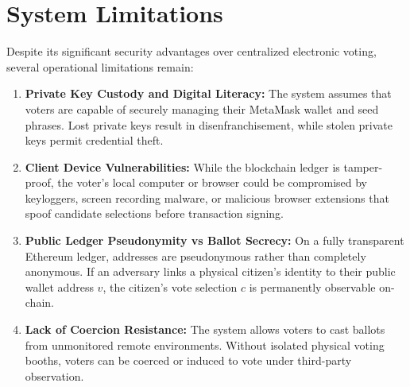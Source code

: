 \documentclass[12pt,a4paper]{report}
\begin{document}
\section{System Limitations}
Despite its significant security advantages over centralized electronic voting, several operational limitations remain:
\begin{enumerate}
    \item \textbf{Private Key Custody and Digital Literacy:} The system assumes that voters are capable of securely managing their MetaMask wallet and seed phrases. Lost private keys result in disenfranchisement, while stolen private keys permit credential theft.
    \item \textbf{Client Device Vulnerabilities:} While the blockchain ledger is tamper-proof, the voter's local computer or browser could be compromised by keyloggers, screen recording malware, or malicious browser extensions that spoof candidate selections before transaction signing.
    \item \textbf{Public Ledger Pseudonymity vs Ballot Secrecy:} On a fully transparent Ethereum ledger, addresses are pseudonymous rather than completely anonymous. If an adversary links a physical citizen's identity to their public wallet address $v$, the citizen's vote selection $c$ is permanently observable on-chain.
    \item \textbf{Lack of Coercion Resistance:} The system allows voters to cast ballots from unmonitored remote environments. Without isolated physical voting booths, voters can be coerced or induced to vote under third-party observation.
\end{enumerate}
\end{document}
